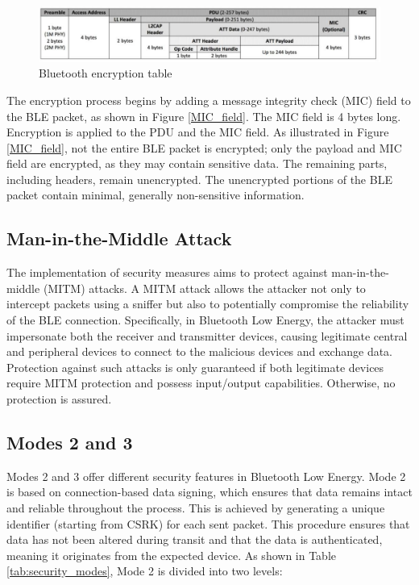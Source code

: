 \documentclass{Configuration_Files/PoliMi3i_thesis}
\begin{document}
\begin{figure}[H]
    \centering
    \includegraphics[scale=0.5]{Bluetooth_Security/10.png}
    \caption{Bluetooth encryption table}
    \label{bluetooth_sec_10}
\end{figure}

The encryption process begins by adding a message integrity check (MIC) field to the BLE packet, as shown in Figure \ref{MIC_field}. The MIC field is 4 bytes long. Encryption is applied to the PDU and the MIC field. As illustrated in Figure \ref{MIC_field}, not the entire BLE packet is encrypted; only the payload and MIC field are encrypted, as they may contain sensitive data. The remaining parts, including headers, remain unencrypted. The unencrypted portions of the BLE packet contain minimal, generally non-sensitive information.

\subsection{Man-in-the-Middle Attack}

The implementation of security measures aims to protect against man-in-the-middle (MITM) attacks. A MITM attack allows the attacker not only to intercept packets using a sniffer but also to potentially compromise the reliability of the BLE connection. Specifically, in Bluetooth Low Energy, the attacker must impersonate both the receiver and transmitter devices, causing legitimate central and peripheral devices to connect to the malicious devices and exchange data. Protection against such attacks is only guaranteed if both legitimate devices require MITM protection and possess input/output capabilities. Otherwise, no protection is assured.

\subsection{Modes 2 and 3}

Modes 2 and 3 offer different security features in Bluetooth Low Energy. Mode 2 is based on connection-based data signing, which ensures that data remains intact and reliable throughout the process. This is achieved by generating a unique identifier (starting from CSRK) for each sent packet. This procedure ensures that data has not been altered during transit and that the data is authenticated, meaning it originates from the expected device. As shown in Table \ref{tab:security_modes}, Mode 2 is divided into two levels:
\end{document}
